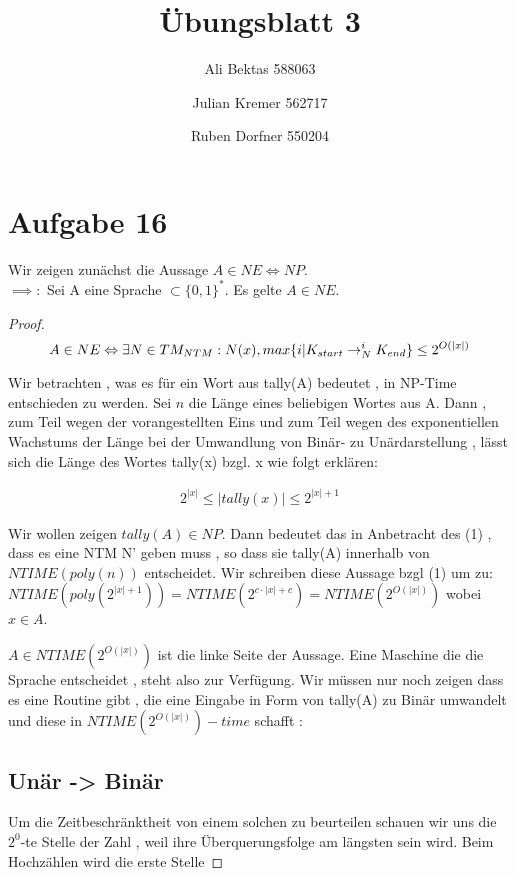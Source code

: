 \documentclass{article}
\title{Übungsblatt 3}
\author{Ali Bektas 588063 \and Julian Kremer 562717 \and Ruben Dorfner 550204}
\begin{document}
\maketitle

\section*{Aufgabe 16}
\vspace{10px}

Wir zeigen zunächst die Aussage $A \in NE \Leftrightarrow NP$.\\
$\implies :$
Sei A eine Sprache  $ \subset \{0,1\}^*$. Es gelte $A \in NE$.

\begin{proof}

\[ A \in NE  \Leftrightarrow \exists N \in TM_{NTM} : N(x) , max\{ i | K_{start} \rightarrow^i_N K_{end}\}  \leq 2^{O(|x|)} \\
\]

Wir betrachten , 
was es für ein Wort aus tally(A) bedeutet , in NP-Time entschieden zu werden. 
Sei $n$ die Länge eines beliebigen Wortes aus  A. Dann  , zum Teil wegen der vorangestellten Eins und zum Teil wegen des exponentiellen Wachstums der Länge bei der Umwandlung von Binär- zu Unärdarstellung , lässt sich die Länge des Wortes tally(x) bzgl. x wie folgt erklären:

\begin{align}
2^{|x|} \leq |tally(x)| \leq 2^{|x|+1}
\end{align}


Wir wollen zeigen $ tally(A) \in NP $.  Dann bedeutet das in Anbetracht des (1) , dass es eine NTM N' geben muss , so dass sie tally(A) innerhalb von $NTIME(poly(n))$ entscheidet. Wir schreiben diese Aussage bzgl (1) um zu: $NTIME(poly(2^{|x| +1})) = NTIME(2^{c\cdot|x|+c}) = NTIME(2^{O(|x|)})$ wobei $x \in A$.

$A \in NTIME(2^{O(|x|)})$ ist die linke Seite der Aussage. Eine Maschine die die Sprache entscheidet , steht also zur Verfügung. Wir müssen nur noch zeigen dass es eine Routine gibt , die eine Eingabe in Form von tally(A) zu Binär umwandelt und diese in  $NTIME(2^{O(|x|)})-time$ schafft : 


\subsection*{Unär -> Binär}

Um die Zeitbeschränktheit von einem solchen zu beurteilen schauen wir uns die $2^0$-te Stelle der Zahl , weil ihre Überquerungsfolge am längsten sein wird. Beim Hochzählen wird die erste Stelle 


\end{proof}
\end{document}
